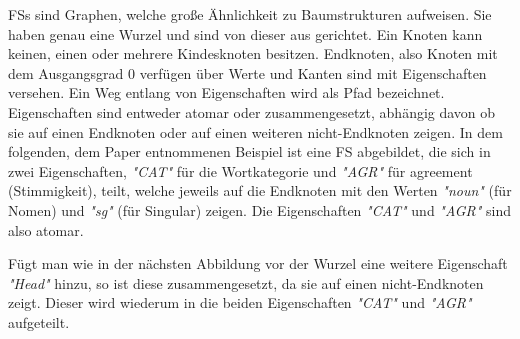 \documentclass[12pt]{paper}
\begin{document}

FSs sind Graphen, welche große Ähnlichkeit zu Baumstrukturen aufweisen. Sie haben genau eine Wurzel und sind von dieser aus gerichtet. Ein Knoten kann keinen, einen oder mehrere Kindesknoten besitzen. Endknoten, also Knoten mit dem Ausgangsgrad 0 verfügen über Werte und Kanten sind mit Eigenschaften versehen. Ein Weg entlang von Eigenschaften wird als Pfad bezeichnet. Eigenschaften sind entweder atomar oder zusammengesetzt, abhängig davon ob sie auf einen Endknoten oder auf einen weiteren nicht-Endknoten zeigen. In dem folgenden, dem Paper entnommenen Beispiel ist eine FS abgebildet, die sich in zwei Eigenschaften, \textit{"CAT"} für die Wortkategorie und \textit{"AGR"} für agreement (Stimmigkeit), teilt, welche jeweils auf die Endknoten mit den Werten \textit{"noun"} (für Nomen) und \textit{"sg"} (für Singular) zeigen. Die Eigenschaften \textit{"CAT"} und \textit{"AGR"} sind also atomar.

\begin{center}
\end{center}

Fügt man wie in der nächsten Abbildung vor der Wurzel eine weitere Eigenschaft \textit{"Head"} hinzu, so ist diese zusammengesetzt, da sie auf einen nicht-Endknoten zeigt. Dieser wird wiederum in die beiden Eigenschaften \textit{"CAT"} und \textit{"AGR"} aufgeteilt. 

\begin{center}
\end{center}
\end{document}
